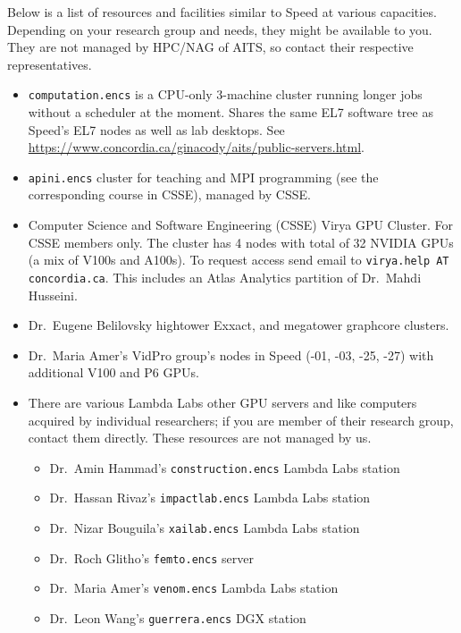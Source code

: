 
Below is a list of resources and facilities similar to Speed at various capacities.
Depending on your research group and needs, they might be available to you. They
are not managed by HPC/NAG of AITS, so contact their respective representatives.

\begin{itemize}
    \item
    \texttt{computation.encs} is a CPU-only 3-machine cluster running longer jobs without
    a scheduler at the moment. Shares the same EL7 software tree as Speed's EL7 nodes
    as well as lab desktops. See \url{https://www.concordia.ca/ginacody/aits/public-servers.html}.

    \item
    \texttt{apini.encs} cluster for teaching and MPI programming (see the corresponding
    course in CSSE), managed by CSSE.

    \item
    Computer Science and Software Engineering (CSSE) Virya GPU Cluster. For CSSE
    members only. The cluster has 4 nodes with total of 32 NVIDIA GPUs (a mix of
    V100s and A100s). To request access send email to \texttt{virya.help AT concordia.ca}.
    This includes an Atlas Analytics partition of Dr.~Mahdi Husseini.

    \item
    Dr.~Eugene Belilovsky hightower Exxact, and megatower graphcore clusters.

    \item
    Dr.~Maria Amer's VidPro group's nodes in Speed (-01, -03, -25, -27) with additional V100 and P6 GPUs.

    \item
    There are various Lambda Labs other GPU servers and like computers
    acquired by individual researchers; if you are member of their
    research group, contact them directly. These resources are not
    managed by us.

    \begin{itemize}
        \item Dr.~Amin Hammad's \texttt{construction.encs} Lambda Labs station
        \item Dr.~Hassan Rivaz's \texttt{impactlab.encs} Lambda Labs station
        \item Dr.~Nizar Bouguila's \texttt{xailab.encs} Lambda Labs station
        \item Dr.~Roch Glitho's \texttt{femto.encs} server
        \item Dr.~Maria Amer's \texttt{venom.encs} Lambda Labs station
        \item Dr.~Leon Wang's \texttt{guerrera.encs} DGX station
    \end{itemize}


\end{itemize}
